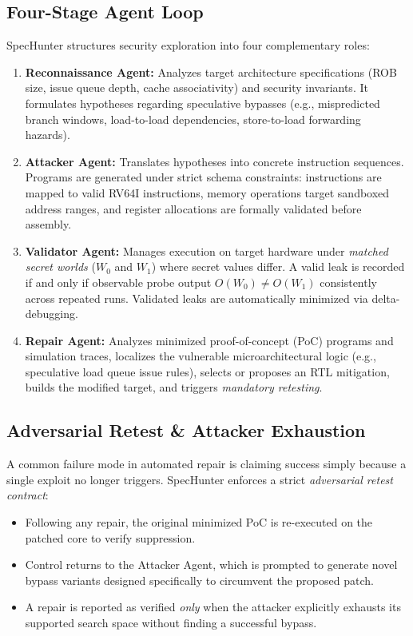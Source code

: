 \documentclass[conference,10pt]{IEEEtran}
\begin{document}
\subsection{Four-Stage Agent Loop}
SpecHunter structures security exploration into four complementary roles:
\begin{enumerate}
    \item \textbf{Reconnaissance Agent:} Analyzes target architecture specifications (ROB size, issue queue depth, cache associativity) and security invariants. It formulates hypotheses regarding speculative bypasses (e.g., mispredicted branch windows, load-to-load dependencies, store-to-load forwarding hazards).
    \item \textbf{Attacker Agent:} Translates hypotheses into concrete instruction sequences. Programs are generated under strict schema constraints: instructions are mapped to valid RV64I instructions, memory operations target sandboxed address ranges, and register allocations are formally validated before assembly.
    \item \textbf{Validator Agent:} Manages execution on target hardware under \textit{matched secret worlds} ($W_0$ and $W_1$) where secret values differ. A valid leak is recorded if and only if observable probe output $O(W_0) \neq O(W_1)$ consistently across repeated runs. Validated leaks are automatically minimized via delta-debugging.
    \item \textbf{Repair Agent:} Analyzes minimized proof-of-concept (PoC) programs and simulation traces, localizes the vulnerable microarchitectural logic (e.g., speculative load queue issue rules), selects or proposes an RTL mitigation, builds the modified target, and triggers \textit{mandatory retesting}.
\end{enumerate}

\subsection{Adversarial Retest \& Attacker Exhaustion}
A common failure mode in automated repair is claiming success simply because a single exploit no longer triggers. SpecHunter enforces a strict \textit{adversarial retest contract}:
\begin{itemize}
    \item Following any repair, the original minimized PoC is re-executed on the patched core to verify suppression.
    \item Control returns to the Attacker Agent, which is prompted to generate novel bypass variants designed specifically to circumvent the proposed patch.
    \item A repair is reported as verified \textit{only} when the attacker explicitly exhausts its supported search space without finding a successful bypass.
\end{itemize}
\end{document}
